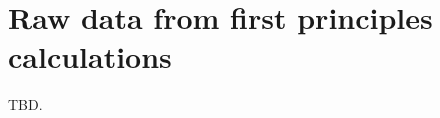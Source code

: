 \documentclass[manuscript=suppinfo,email=true,hyperref=true,keywords=false]{achemso}
\begin{document}
\section{Raw data from first principles calculations}
\label{sec:raw}

TBD.








\section*{}
\label{sec:ref}

\end{document}
